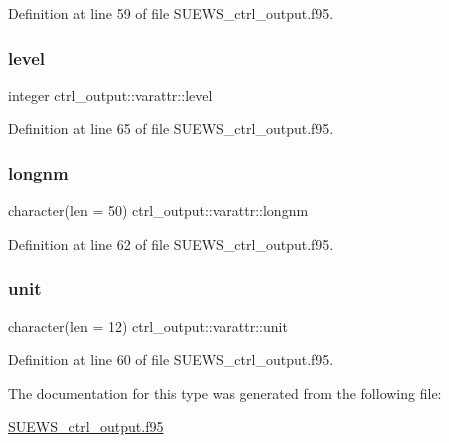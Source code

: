 Definition at line 59 of file S\+U\+E\+W\+S\+\_\+ctrl\+\_\+output.\+f95.

\mbox{\label{structctrl__output_1_1varattr_a0b8734fea9cd4b6406b8faf8dc16c6d8}} 
\subsubsection{\texorpdfstring{level}{level}}
{\footnotesize\ttfamily integer ctrl\+\_\+output\+::varattr\+::level}



Definition at line 65 of file S\+U\+E\+W\+S\+\_\+ctrl\+\_\+output.\+f95.

\mbox{\label{structctrl__output_1_1varattr_ad9c9880260734807056c2bc27806a5ec}} 
\subsubsection{\texorpdfstring{longnm}{longnm}}
{\footnotesize\ttfamily character(len = 50) ctrl\+\_\+output\+::varattr\+::longnm}



Definition at line 62 of file S\+U\+E\+W\+S\+\_\+ctrl\+\_\+output.\+f95.

\mbox{\label{structctrl__output_1_1varattr_aa0d2944f6f1767e7e856831c96f4dffb}} 
\subsubsection{\texorpdfstring{unit}{unit}}
{\footnotesize\ttfamily character(len = 12) ctrl\+\_\+output\+::varattr\+::unit}



Definition at line 60 of file S\+U\+E\+W\+S\+\_\+ctrl\+\_\+output.\+f95.



The documentation for this type was generated from the following file\+:\begin{DoxyCompactItemize}
\item 
\hyperlink{_s_u_e_w_s__ctrl__output_8f95}{S\+U\+E\+W\+S\+\_\+ctrl\+\_\+output.\+f95}\end{DoxyCompactItemize}
